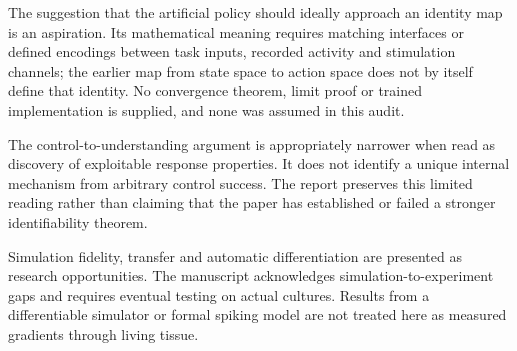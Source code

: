 \documentclass[10pt]{article}
\begin{document}
The suggestion that the artificial policy should ideally approach an identity map is an aspiration. Its mathematical meaning requires matching interfaces or defined encodings between task inputs, recorded activity and stimulation channels; the earlier map from state space to action space does not by itself define that identity. No convergence theorem, limit proof or trained implementation is supplied, and none was assumed in this audit.\par
The control-to-understanding argument is appropriately narrower when read as discovery of exploitable response properties. It does not identify a unique internal mechanism from arbitrary control success. The report preserves this limited reading rather than claiming that the paper has established or failed a stronger identifiability theorem.\par
Simulation fidelity, transfer and automatic differentiation are presented as research opportunities. The manuscript acknowledges simulation-to-experiment gaps and requires eventual testing on actual cultures. Results from a differentiable simulator or formal spiking model are not treated here as measured gradients through living tissue.\par
\end{document}
